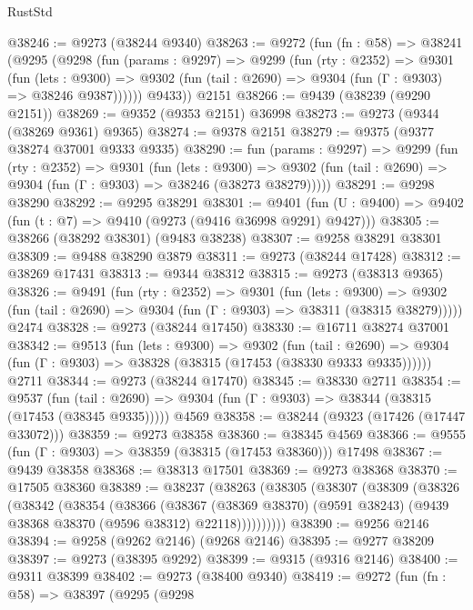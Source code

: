 \begin{lexlean}{RustStd}
\begin{coremodule}
@38246 := @9273 (@38244 @9340)
@38263 := @9272
    (fun (fn : @58) =>
    @38241
      (@9295
        (@9298
          (fun (params : @9297) =>
          @9299
            (fun (rty : @2352) =>
            @9301
              (fun (lets : @9300) =>
              @9302 (fun (tail : @2690) => @9304 (fun (Γ : @9303) => @38246 @9387))))))
        @9433))
    @2151
@38266 := @9439 (@38239 (@9290 @2151))
@38269 := @9352 (@9353 @2151) @36998
@38273 := @9273 (@9344 (@38269 @9361) @9365)
@38274 := @9378 @2151
@38279 := @9375 (@9377 @38274 @37001 @9333 @9335)
@38290 := fun (params : @9297) =>
  @9299
    (fun (rty : @2352) =>
    @9301
      (fun (lets : @9300) =>
      @9302 (fun (tail : @2690) => @9304 (fun (Γ : @9303) => @38246 (@38273 @38279)))))
@38291 := @9298 @38290
@38292 := @9295 @38291
@38301 := @9401
    (fun (U : @9400) => @9402 (fun (t : @7) => @9410 (@9273 (@9416 @36998 @9291) @9427)))
@38305 := @38266 (@38292 @38301) (@9483 @38238)
@38307 := @9258 @38291 @38301
@38309 := @9488 @38290 @3879
@38311 := @9273 (@38244 @17428)
@38312 := @38269 @17431
@38313 := @9344 @38312
@38315 := @9273 (@38313 @9365)
@38326 := @9491
    (fun (rty : @2352) =>
    @9301
      (fun (lets : @9300) =>
      @9302 (fun (tail : @2690) => @9304 (fun (Γ : @9303) => @38311 (@38315 @38279)))))
    @2474
@38328 := @9273 (@38244 @17450)
@38330 := @16711 @38274 @37001
@38342 := @9513
    (fun (lets : @9300) =>
    @9302
      (fun (tail : @2690) =>
      @9304 (fun (Γ : @9303) => @38328 (@38315 (@17453 (@38330 @9333 @9335))))))
    @2711
@38344 := @9273 (@38244 @17470)
@38345 := @38330 @2711
@38354 := @9537
    (fun (tail : @2690) => @9304 (fun (Γ : @9303) => @38344 (@38315 (@17453 (@38345 @9335)))))
    @4569
@38358 := @38244 (@9323 (@17426 (@17447 @33072)))
@38359 := @9273 @38358
@38360 := @38345 @4569
@38366 := @9555 (fun (Γ : @9303) => @38359 (@38315 (@17453 @38360))) @17498
@38367 := @9439 @38358
@38368 := @38313 @17501
@38369 := @9273 @38368
@38370 := @17505 @38360
@38389 := @38237
    (@38263
      (@38305
        (@38307
          (@38309
            (@38326
              (@38342
                (@38354
                  (@38366
                    (@38367
                      (@38369 @38370)
                      (@9591 @38243)
                      (@9439 @38368 @38370 (@9596 @38312) @22118))))))))))
@38390 := @9256 @2146
@38394 := @9258 (@9262 @2146) (@9268 @2146)
@38395 := @9277 @38209
@38397 := @9273 (@38395 @9292)
@38399 := @9315 (@9316 @2146)
@38400 := @9311 @38399
@38402 := @9273 (@38400 @9340)
@38419 := @9272
    (fun (fn : @58) =>
    @38397
      (@9295
        (@9298

\end{coremodule}
\end{lexlean}
